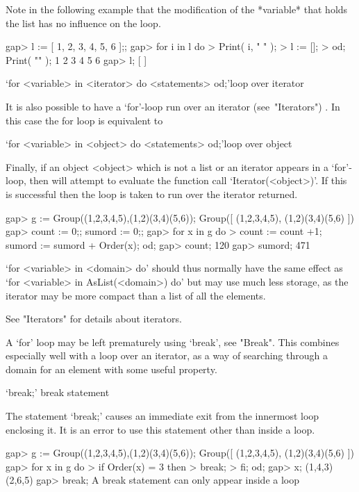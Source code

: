 {Note in the following example that the modification of the *variable*
that holds the list has no influence on the loop.

\beginexample
gap> l := [ 1, 2, 3, 4, 5, 6 ];;
gap> for i in l do
>    Print( i, " " );
>    l := [];
> od; Print( "\n" );
1 2 3 4 5 6
gap> l;
[ ]
\endexample

\>`for <variable> in <iterator> do <statements> od;'{loop over iterator}

It is also possible to have a `for'-loop run over an iterator
(see~"Iterators") . In this case
the for loop is equivalent to


\>`for <variable> in <object> do <statements> od;'{loop over object}

Finally, if an object <object> which is not a list or an iterator appears in a
`for'-loop, then {\GAP} will attempt to evaluate the function call
`Iterator(<object>)'. If this is successful then the loop is taken to
run over the iterator returned.

\beginexample
gap> g := Group((1,2,3,4,5),(1,2)(3,4)(5,6));       
Group([ (1,2,3,4,5), (1,2)(3,4)(5,6) ])
gap> count := 0;; sumord := 0;;
gap> for x in g do
> count := count +1; sumord := sumord + Order(x); od; 
gap> count;
120
gap> sumord;
471
\endexample

`for <variable> in <domain> do' should thus normally have the same
effect as `for <variable> in AsList(<domain>) do' but may use much
less storage, as the iterator may be more compact than a list of all
the elements.

See "Iterators" for details about iterators.

A `for' loop may be left prematurely using `break', see "Break". This
combines especially well with a loop over an iterator, as a way of
searching through a domain for an element with some useful property.


\>`break;' {break statement}

The statement `break;' causes an immediate exit from the innermost
loop enclosing it. It is an error to use this statement other than
inside a loop.

\beginexample
gap> g := Group((1,2,3,4,5),(1,2)(3,4)(5,6));           
Group([ (1,2,3,4,5), (1,2)(3,4)(5,6) ])
gap> for x in g do
> if Order(x) = 3 then
> break; 
> fi; od;
gap> x;
(1,4,3)(2,6,5)
\endexample
\begintt
gap> break;
A break statement can only appear inside a loop
\endtt


}
